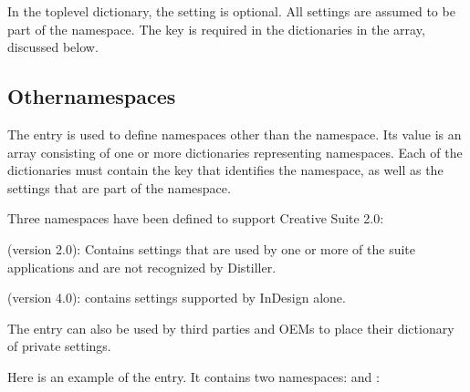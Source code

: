 \documentclass[letterpaper,12pt,english,openany,oneside]{sphinxmanual}
\begin{document}
In the top\sphinxhyphen{}level dictionary, the  setting is optional. All settings are assumed to be part of the  namespace. The  key is required in the dictionaries in the  array, discussed below.


\subsection{Othernamespaces}
\label{\detokenize{index:othernamespaces}}
The  entry is used to define namespaces other than the  namespace. Its value is an array consisting of one or more dictionaries representing namespaces. Each of the dictionaries must contain the  key that identifies the namespace, as well as the settings that are part of the namespace.

Three namespaces have been defined to support Creative Suite 2.0:

 (version 2.0): Contains settings that are used by one or more of the suite applications and are not recognized by Distiller.

 (version 4.0): contains settings supported by InDesign alone.

The  entry can also be used by third parties and OEMs to place their dictionary of private settings.

Here is an example of the  entry. It contains two namespaces:  and  :
\end{document}
